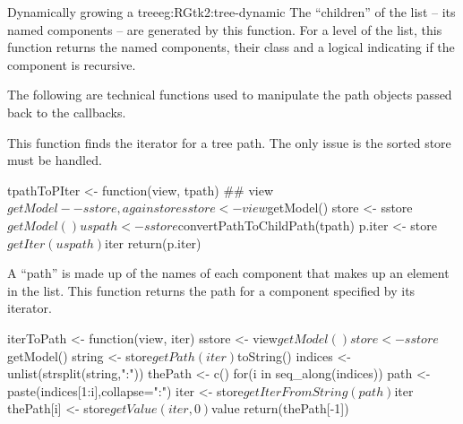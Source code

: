 \begin{example}{Dynamically growing a tree}{eg:RGtk2:tree-dynamic}
The ``children'' of the list -- its named components -- are generated
by this function. For a level of the list, this function returns the
named components, their class and a logical indicating if the
component is recursive.
\begin{Schunk}
\end{Schunk}
 

The following are technical functions used to manipulate the path
objects passed back to the callbacks.

This function finds the iterator for a tree path. The only issue is
the sorted store must be handled.
\begin{Schunk}
\begin{Sinput}
 tpathToPIter <- function(view, tpath) {
   ## view$getModel -- sstore, again store
   sstore <- view$getModel()
   store <- sstore$getModel()
   uspath <- sstore$convertPathToChildPath(tpath)
   p.iter <- store$getIter(uspath)$iter
   return(p.iter)
 }
\end{Sinput}
\end{Schunk}

A ``path'' is made up of the names of each component that makes up an
element in the list. This function returns the path for a component
specified by its iterator.
\begin{Schunk}
\begin{Sinput}
 iterToPath <- function(view, iter) {
   sstore <- view$getModel()
   store <- sstore$getModel()
   string <- store$getPath(iter)$toString()
   indices <- unlist(strsplit(string,":"))
   thePath <- c()
   for(i in seq_along(indices)) {
     path <- paste(indices[1:i],collapse=":")
     iter <- store$getIterFromString(path)$iter
     thePath[i] <- store$getValue(iter,0)$value
   }
   return(thePath[-1])
 }
\end{Sinput}
\end{Schunk}


\end{example}
